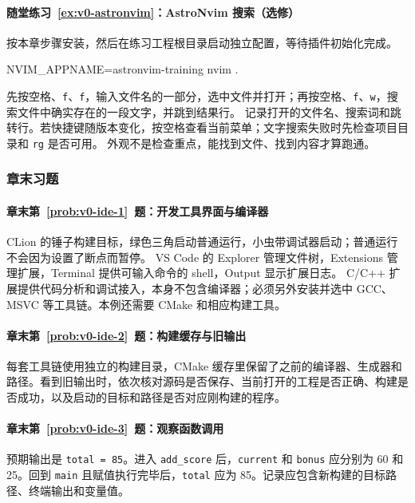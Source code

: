 \paragraph*{随堂练习~\ref{ex:v0-astronvim}：AstroNvim 搜索（选修）}
\begin{solution}
按本章步骤安装，然后在练习工程根目录启动独立配置，等待插件初始化完成。

\begin{tbash}
NVIM_APPNAME=astronvim-training nvim .
\end{tbash}

先按空格、\texttt{f}、\texttt{f}，输入文件名的一部分，选中文件并打开；再按空格、\texttt{f}、\texttt{w}，搜索文件中确实存在的一段文字，并跳到结果行。
记录打开的文件名、搜索词和跳转行。若快捷键随版本变化，按空格查看当前菜单；文字搜索失败时先检查项目目录和 \texttt{rg} 是否可用。
外观不是检查重点，能找到文件、找到内容才算跑通。
\end{solution}

\subsubsection*{章末习题}

\paragraph*{章末第~\ref{prob:v0-ide-1}~题：开发工具界面与编译器}
\begin{solution}
CLion 的锤子构建目标，绿色三角启动普通运行，小虫带调试器启动；普通运行不会因为设置了断点而暂停。
VS Code 的 Explorer 管理文件树，Extensions 管理扩展，Terminal 提供可输入命令的 shell，Output 显示扩展日志。
C/C++ 扩展提供代码分析和调试接入，本身不包含编译器；必须另外安装并选中 GCC、MSVC 等工具链。本例还需要 CMake 和相应构建工具。
\end{solution}

\paragraph*{章末第~\ref{prob:v0-ide-2}~题：构建缓存与旧输出}
\begin{solution}
每套工具链使用独立的构建目录，CMake 缓存里保留了之前的编译器、生成器和路径。看到旧输出时，依次核对源码是否保存、当前打开的工程是否正确、构建是否成功，以及启动的目标和路径是否对应刚构建的程序。
\end{solution}

\paragraph*{章末第~\ref{prob:v0-ide-3}~题：观察函数调用}
\begin{solution}
预期输出是 \texttt{total = 85}。进入 \texttt{add\_score} 后，\texttt{current} 和 \texttt{bonus} 应分别为 60 和 25。回到 \texttt{main} 且赋值执行完毕后，\texttt{total} 应为 85。记录应包含新构建的目标路径、终端输出和变量值。
\end{solution}

